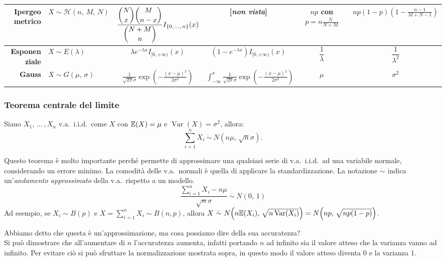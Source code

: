 \begin{landscape}
\begin{table}[p]
\begin{tabular}{r|l||c|c|c|c}
    \hline \phantom{$\displaystyle  \sum_{i=0}^{\lfloor x \rfloor}$} 
    \textbf{Ipergeometrico} & $X \sim \mathcal H{(n, \, M, \, N)}$ & $\displaystyle \frac{\dbinom{N}{x} \dbinom{M}{n-x}}{{\dbinom {N+M}{n}}} I_{\{0, \, \dots, \, n\}}(x)$ & [\textit{non vista}] & $\displaystyle np$ con $p= n\frac {N}{N + M}$ & $\displaystyle np(1-p)\!\left(1 - \frac{n-1}{M+N-1}\right)$ \\
    \hline \phantom{$\displaystyle  \sum_{i=0}^{\lfloor x \rfloor}$}
    \textbf{Esponenziale} & $X \sim E{(\lambda)}$ & $\lambda e^{-\lambda x} I_{[0, +\infty)}(x)$ & $(1-e^{-\lambda x}) I_{[0, +\infty)}(x)$ & $\dfrac 1 \lambda$ & $\dfrac {1}{\lambda^2}$ \\
    \hline \phantom{$\displaystyle  \sum_{i=0}^{\lfloor x \rfloor}$}
    \textbf{Gauss} & $X \sim G{(\mu, \, \sigma)}$ & $\displaystyle \frac{1}{\sqrt{2 \pi} \sigma} \exp{\!\left(-\frac{(x-\mu)^2}{2\sigma^2} \right)}$ & $\displaystyle \int_{-\infty}^{x} \frac{1}{\sqrt{2 \pi} \sigma} \exp{\!\left(-\frac{(x-\mu)^2}{2\sigma^2} \right)}$ & $\mu$ & $\sigma^2$ 
\end{tabular}
\end{table}

\end{landscape}

\subsubsection{Teorema centrale del limite}
\begin{teorema}
Siano $X_1, \, \dots \, , X_n$ v.a.\ i.i.d.\ come $X$ con $\mathbb{E}(X) = \mu$ e $\operatorname{Var}(X) = \sigma^2$, allora: \[\sum_{i=1}^n X_i \ \dot{\sim} \ N{(n\mu, \,\sqrt{n} \sigma)}.\]
\end{teorema}

Questo teorema è molto importante perché permette di approssimare una qualsiasi serie di v.a.\ i.i.d.\ ad una variabile normale, considerando un errore minimo.
La comodità delle v.a.\ normali è quella di applicare la standardizzazione. La notazione $\dot \sim$ indica un'\textit{andamento approssimato} della v.a.\ rispetto a un modello.
$$
\frac{\displaystyle \sum_{i=1}^n X_i - n\mu}{\sqrt{n} \sigma} \ \dot{\sim} \ N{(0,\,1)}
$$
Ad esempio, se $X_i \sim B{(p)}$ e $X = \sum\limits_{i=1}^n X_i \sim B{(n, p)} $, allora $X \ \dot{\sim} \ N{\left (n \mathbb{E}(X_i), \, \sqrt{n \operatorname{Var}(X_i)} \right)} = N{\left (np, \, \sqrt{np(1-p)} \right )}$.

\noindent Abbiamo detto che questa è un'approssimazione, ma cosa possiamo dire della sua accuratezza? \\
Si può dimostrare che all'aumentare di $n$ l'accuratezza aumenta, infatti portando $n$ ad infinito sia il valore atteso che la varianza vanno ad infinito.
Per evitare ciò si può sfruttare la normalizzazione mostrata sopra, in questo modo il valore atteso diventa $0$ e la varianza $1$.


